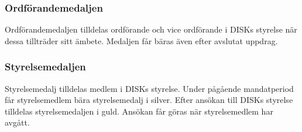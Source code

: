 	\subsubsection{Ordförandemedaljen}
	\label{subsubsec:ordforandemedaljen}
		Ordförandemedaljen tilldelas ordförande och vice ordförande i DISKs styrelse när dessa tillträder sitt ämbete. Medaljen får bäras även efter avslutat uppdrag.


	\subsubsection{Styrelsemedaljen}
	\label{subsubsec:styrelsemedaljen}
		Styrelsemedalj tilldelas medlem i DISKs styrelse. Under pågående mandatperiod får styrelsemedlem bära styrelsemedalj i silver. Efter ansökan till DISKs styrelse tilldelas styrelsemedaljen i guld. Ansökan får göras när styrelsemedlem har avgått.
